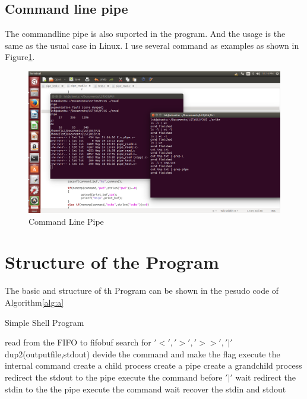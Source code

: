 \documentclass{article}
\begin{document}
\subsection{Command line pipe}
The commandline pipe is also suported in the program. And the usage is the same as the usual case in Linux. I use several command as examples as shown in Figure\ref{fig:d}.
\begin{figure}[htbp]
\label{fig:d}
\includegraphics[width =400pt ,keepaspectratio ]{4.png}
\caption{Command Line Pipe}
\end{figure}
\section{Structure of the Program}
The basic and structure of th Program can be shown in the pesudo code of Algorithm\ref{alg:a}
\begin{algorithm}[htbp]  
\label{alg:a}
\caption{Simple Shell Program}
\begin{algorithmic}[1]
\State read from the FIFO to fifobuf
\State search for $'<','>','>>','|'$
\State dup2(outputfile,stdout)
\EndIf
{}
\State devide the command and make the flag
\EndIf
{}
\State execute the internal command
\Else
\State create a child process
\State create a pipe
\State create a grandchild process
\State redirect the stdout to the pipe
\State execute the command before $'|'$
\Else 
\State wait
\State redirect the stdin to the the pipe
\EndIf
\EndIf
\State execute the command 
\Else
\State wait
\EndIf
\EndIf
\State recover the stdin and stdout
\EndWhile
\end{algorithmic}
\end{algorithm}
\end{document}
